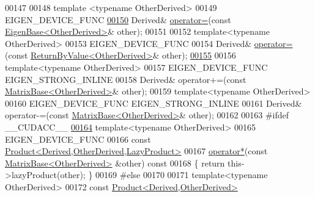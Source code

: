 \begin{DoxyCode}
00147 
00148     \textcolor{keyword}{template} <\textcolor{keyword}{typename} OtherDerived>
00149     EIGEN\_DEVICE\_FUNC
\hyperlink{group___core___module_a5e61bcee01dbdae901280f363610f0e3}{00150}     Derived& \hyperlink{group___core___module_a706a4dd1ee54786e9210de1a4bf02600}{operator=}(\textcolor{keyword}{const} \hyperlink{group___core___module_struct_eigen_1_1_eigen_base}{EigenBase<OtherDerived>}& other);
00151 
00152     \textcolor{keyword}{template}<\textcolor{keyword}{typename} OtherDerived>
00153     EIGEN\_DEVICE\_FUNC
00154     Derived& \hyperlink{group___core___module_a706a4dd1ee54786e9210de1a4bf02600}{operator=}(\textcolor{keyword}{const} \hyperlink{group___core___module_class_eigen_1_1_return_by_value}{ReturnByValue<OtherDerived>}& other);
\hyperlink{group___core___module_a1738254da7bde8e46bb50b47a60adff0}{00155} 
00156     \textcolor{keyword}{template}<\textcolor{keyword}{typename} OtherDerived>
00157     EIGEN\_DEVICE\_FUNC EIGEN\_STRONG\_INLINE
00158     Derived& operator+=(\textcolor{keyword}{const} \hyperlink{group___core___module_class_eigen_1_1_matrix_base}{MatrixBase<OtherDerived>}& other);
00159     \textcolor{keyword}{template}<\textcolor{keyword}{typename} OtherDerived>
00160     EIGEN\_DEVICE\_FUNC EIGEN\_STRONG\_INLINE
00161     Derived& operator-=(\textcolor{keyword}{const} \hyperlink{group___core___module_class_eigen_1_1_matrix_base}{MatrixBase<OtherDerived>}& other);
00162 
00163 \textcolor{preprocessor}{#ifdef \_\_CUDACC\_\_}
\hyperlink{group___core___module_aa60c37d8bb4139f7254d4fb9e2cebb68}{00164}     \textcolor{keyword}{template}<\textcolor{keyword}{typename} OtherDerived>
00165     EIGEN\_DEVICE\_FUNC
00166     \textcolor{keyword}{const} \hyperlink{group___core___module_class_eigen_1_1_product}{Product<Derived,OtherDerived,LazyProduct>}
00167     \hyperlink{group___core___module_ae2d220efbf7047f0894787888288cfcc}{operator*}(\textcolor{keyword}{const} \hyperlink{group___core___module_class_eigen_1_1_matrix_base}{MatrixBase<OtherDerived>} &other)\textcolor{keyword}{ const}
00168 \textcolor{keyword}{    }\{ \textcolor{keywordflow}{return} this->lazyProduct(other); \}
00169 \textcolor{preprocessor}{#else}
00170 
00171     \textcolor{keyword}{template}<\textcolor{keyword}{typename} OtherDerived>
00172     \textcolor{keyword}{const} \hyperlink{group___core___module_class_eigen_1_1_product}{Product<Derived,OtherDerived>}

\end{DoxyCode}
